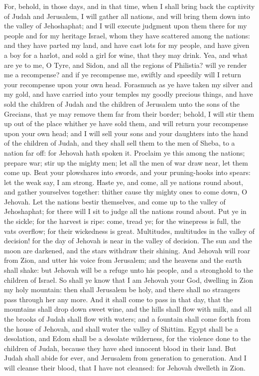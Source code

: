 For, behold, in those days, and in that time, when I shall bring back the captivity of Judah and Jerusalem, I will gather all nations, and will bring them down into the valley of Jehoshaphat; and I will execute judgment upon them there for my people and for my heritage Israel, whom they have scattered among the nations: and they have parted my land, and have cast lots for my people, and have given a boy for a harlot, and sold a girl for wine, that they may drink. Yea, and what are ye to me, O Tyre, and Sidon, and all the regions of Philistia? will ye render me a recompense? and if ye recompense me, swiftly and speedily will I return your recompense upon your own head. Forasmuch as ye have taken my silver and my gold, and have carried into your temples my goodly precious things, and have sold the children of Judah and the children of Jerusalem unto the sons of the Grecians, that ye may remove them far from their border; behold, I will stir them up out of the place whither ye have sold them, and will return your recompense upon your own head; and I will sell your sons and your daughters into the hand of the children of Judah, and they shall sell them to the men of Sheba, to a nation far off: for Jehovah hath spoken it.  Proclaim ye this among the nations; prepare war; stir up the mighty men; let all the men of war draw near, let them come up. Beat your plowshares into swords, and your pruning-hooks into spears: let the weak say, I am strong. Haste ye, and come, all ye nations round about, and gather yourselves together: thither cause thy mighty ones to come down, O Jehovah. Let the nations bestir themselves, and come up to the valley of Jehoshaphat; for there will I sit to judge all the nations round about. Put ye in the sickle; for the harvest is ripe: come, tread ye; for the winepress is full, the vats overflow; for their wickedness is great.  Multitudes, multitudes in the valley of decision! for the day of Jehovah is near in the valley of decision. The sun and the moon are darkened, and the stars withdraw their shining. And Jehovah will roar from Zion, and utter his voice from Jerusalem; and the heavens and the earth shall shake: but Jehovah will be a refuge unto his people, and a stronghold to the children of Israel. So shall ye know that I am Jehovah your God, dwelling in Zion my holy mountain: then shall Jerusalem be holy, and there shall no strangers pass through her any more.  And it shall come to pass in that day, that the mountains shall drop down sweet wine, and the hills shall flow with milk, and all the brooks of Judah shall flow with waters; and a fountain shall come forth from the house of Jehovah, and shall water the valley of Shittim. Egypt shall be a desolation, and Edom shall be a desolate wilderness, for the violence done to the children of Judah, because they have shed innocent blood in their land. But Judah shall abide for ever, and Jerusalem from generation to generation. And I will cleanse their blood, that I have not cleansed: for Jehovah dwelleth in Zion. 